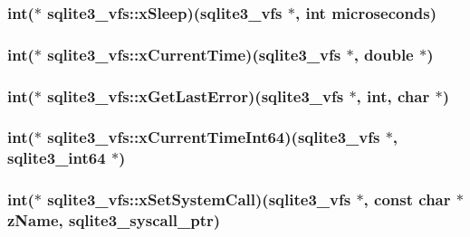 \hypertarget{structsqlite3__vfs_8ebcfaceced9713024cb8e2508fe6c1b}{
\subsubsection[xSleep]{\setlength{\rightskip}{0pt plus 5cm}int($\ast$ {\bf sqlite3\_\-vfs::xSleep})({\bf sqlite3\_\-vfs} $\ast$, int microseconds)}}
\label{structsqlite3__vfs_8ebcfaceced9713024cb8e2508fe6c1b}


\hypertarget{structsqlite3__vfs_b85a8a3ab59f76a6685508fefaa7b691}{
\subsubsection[xCurrentTime]{\setlength{\rightskip}{0pt plus 5cm}int($\ast$ {\bf sqlite3\_\-vfs::xCurrentTime})({\bf sqlite3\_\-vfs} $\ast$, double $\ast$)}}
\label{structsqlite3__vfs_b85a8a3ab59f76a6685508fefaa7b691}


\hypertarget{structsqlite3__vfs_4994110c79d082f7770ce553d507748f}{
\subsubsection[xGetLastError]{\setlength{\rightskip}{0pt plus 5cm}int($\ast$ {\bf sqlite3\_\-vfs::xGetLastError})({\bf sqlite3\_\-vfs} $\ast$, int, char $\ast$)}}
\label{structsqlite3__vfs_4994110c79d082f7770ce553d507748f}


\hypertarget{structsqlite3__vfs_a281584c422969b7f0df0e5f918fc590}{
\subsubsection[xCurrentTimeInt64]{\setlength{\rightskip}{0pt plus 5cm}int($\ast$ {\bf sqlite3\_\-vfs::xCurrentTimeInt64})({\bf sqlite3\_\-vfs} $\ast$, {\bf sqlite3\_\-int64} $\ast$)}}
\label{structsqlite3__vfs_a281584c422969b7f0df0e5f918fc590}


\hypertarget{structsqlite3__vfs_69996d40229d6eabe6869bb3fc80b730}{
\subsubsection[xSetSystemCall]{\setlength{\rightskip}{0pt plus 5cm}int($\ast$ {\bf sqlite3\_\-vfs::xSetSystemCall})({\bf sqlite3\_\-vfs} $\ast$, const char $\ast${\bf zName}, {\bf sqlite3\_\-syscall\_\-ptr})}}
\label{structsqlite3__vfs_69996d40229d6eabe6869bb3fc80b730}


